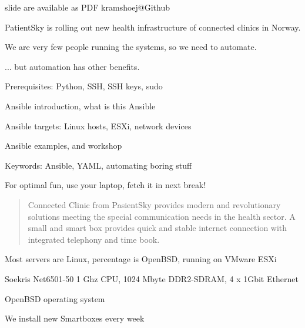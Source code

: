 \documentclass[18pt,landscape,a4paper,footrule]{foils}
\begin{document}


\vskip 1cm
\centerline{\footnotesize slide are available as PDF kramshoej@Github}


PatientSky is rolling out new health infrastructure of connected clinics in Norway.

We are very few people running the systems, so we need to automate.

... but automation has other benefits.

\begin{list1}
\item Prerequisites: Python, SSH, SSH keys, sudo
\item Ansible introduction, what is this Ansible
\item Ansible targets: Linux hosts, ESXi, network devices
\item Ansible examples, and workshop
\item Keywords:
Ansible, YAML, automating boring stuff
\end{list1}

\centerline{For optimal fun, use your laptop, fetch it in next break!}




\begin{quote}
Connected Clinic from PasientSky provides modern and revolutionary solutions meeting the special communication needs in the health sector. A small and smart box provides quick and stable internet connection with integrated telephony and time book.
\end{quote}



Most servers are Linux, percentage is OpenBSD, running on VMware ESXi



\begin{list2}
\item Soekris Net6501-50 1 Ghz CPU, 1024 Mbyte DDR2-SDRAM, 4 x 1Gbit Ethernet
\item OpenBSD operating system
\item We install new Smartboxes every week
\end{list2}
\end{document}
